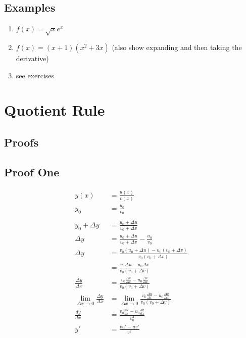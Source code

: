 \documentclass[letterpaper, landscape]{exam}
\begin{document}
  \subsection{Examples} %
  
  \begin{enumerate}
    \item $f(x) = \sqrt{x} e^x$

    \item $f(x) = (x + 1)(x^2 + 3x)$ (also show expanding and then taking the derivative)

    \item see exercises
  \end{enumerate}

  \section{Quotient Rule} %
  \label{sec:qr}
  
  \subsection{Proofs} %
  
  \subsection{Proof One} %
  
  \begin{align*}
    y(x)                      & = \frac{u(x)}{v(x)} \\
    y_0                       & = \frac{u_0}{v_0} \\
    \\
    y_0 + \Delta y            & = \frac{u_0 + \Delta u}{v_0 + \Delta v} \\
    \Delta y                  & = \frac{u_0 + \Delta u}{v_0 + \Delta v} - \frac{u_0}{v_0}\\
    \Delta y                  & = \frac{v_0 (u_0 + \Delta u) - u_0 (v_0 + \Delta v)}{v_0 (v_0 + \Delta v)}\\
                              & = \frac{v_0 \Delta u - u_0 \Delta v}{v_0 (v_0 + \Delta v)}\\
    \frac{\Delta y}{\Delta x} & = \frac{v_0 \frac{\Delta u}{\Delta x} - u_0 \frac{\Delta v}{\Delta x}}
                                                                         {v_0 (v_0 + \Delta v)} \\
    \lim_{\Delta x \to 0} \frac{\Delta y}{\Delta x} & = \lim_{\Delta x \to 0} \frac{v_0 \frac{\Delta u}{\Delta x} - u_0 \frac{\Delta v}{\Delta x}}
                                                                                     {v_0 (v_0 + \Delta v)}\\
    \frac{dy}{dx} & = \frac{v_0 \frac{du}{dx} - u_0 \frac{dv}{dx}}{v_0^2} \\
    y'            & = \frac{vu' - uv'}{v^2} \\
  \end{align*}
\end{document}
